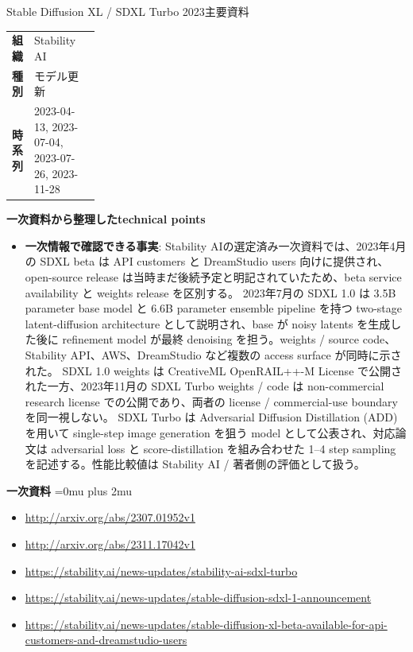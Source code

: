 \begin{technicalnote}{Stable Diffusion XL / SDXL Turbo 2023}{主要資料}
\begingroup
\begin{tabularx}{\linewidth}{@{}>{\bfseries}p{0.22\linewidth}X@{}}
組織 & Stability AI \\
種別 & モデル更新 \\
時系列 & 2023-04-13, 2023-07-04, 2023-07-26, 2023-11-28 \\
\end{tabularx}
\smallskip
{\bfseries 一次資料から整理したtechnical points}
\begin{itemize}[leftmargin=1.5em,itemsep=0.35em]
\item \textbf{一次情報で確認できる事実}: Stability AIの選定済み一次資料では、2023年4月の SDXL beta は API customers と DreamStudio users 向けに提供され、open-source release は当時まだ後続予定と明記されていたため、beta service availability と weights release を区別する。 2023年7月の SDXL 1.0 は 3.5B parameter base model と 6.6B parameter ensemble pipeline を持つ two-stage latent-diffusion architecture として説明され、base が noisy latents を生成した後に refinement model が最終 denoising を担う。weights / source code、Stability API、AWS、DreamStudio など複数の access surface が同時に示された。 SDXL 1.0 weights は CreativeML OpenRAIL++-M License で公開された一方、2023年11月の SDXL Turbo weights / code は non-commercial research license での公開であり、両者の license / commercial-use boundary を同一視しない。 SDXL Turbo は Adversarial Diffusion Distillation (ADD) を用いて single-step image generation を狙う model として公表され、対応論文は adversarial loss と score-distillation を組み合わせた 1--4 step sampling を記述する。性能比較値は Stability AI / 著者側の評価として扱う。
\end{itemize}
\begin{minipage}{\linewidth}
\begin{samepage}
{\bfseries 一次資料}
\begingroup\sloppy
\Urlmuskip=0mu plus 2mu\relax
\begin{itemize}[leftmargin=1.5em,itemsep=0.25em]
\item {\scriptsize\url{http://arxiv.org/abs/2307.01952v1}}
\item {\scriptsize\url{http://arxiv.org/abs/2311.17042v1}}
\item {\scriptsize\url{https://stability.ai/news-updates/stability-ai-sdxl-turbo}}
\item {\scriptsize\url{https://stability.ai/news-updates/stable-diffusion-sdxl-1-announcement}}
\item {\scriptsize\url{https://stability.ai/news-updates/stable-diffusion-xl-beta-available-for-api-customers-and-dreamstudio-users}}
\end{itemize}
\endgroup
\end{samepage}
\end{minipage}
\endgroup
\end{technicalnote}
\medskip

